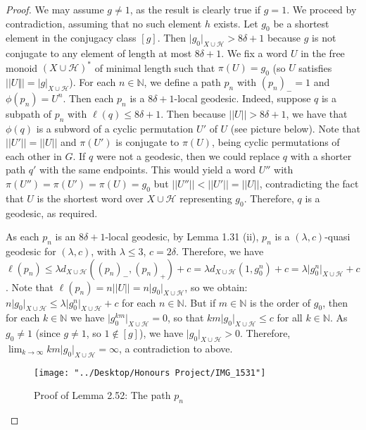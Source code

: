 \documentclass[12pt]{article}
\newcommand{\vs}{\vskip10pt}
\begin{document}
	\begin{proof}
		
		We may assume $g \neq 1$, as the result is clearly true if $g = 1$. We proceed by contradiction, assuming that no such element $h$ exists. Let $g_0$ be a shortest element in the conjugacy class $[g]$. Then $\vert g_0 \vert_{X \cup \mathcal{H}} > 8 \delta + 1$ because $g$ is not conjugate to any element of length at most $8 \delta + 1$. We fix a word $U$ in the free monoid $(X \cup \mathcal{H})^*$ of minimal length such that $\pi(U) = g_0$ (so $U$ satisfies $\vert \vert U \Vert \vert = \vert g \vert_{X \cup \mathcal{H}}$). For each $n \in \mathbb{N}$, we define a path $p_n$ with $(p_n)_- = 1$ and $\phi(p_n) = U^n$. Then each $p_n$ is a $8 \delta + 1$-local geodesic. Indeed, suppose $q$ is a subpath of $p_n$ with $\ell(q) \leq 8 \delta + 1$. Then because $\vert \vert U \vert \vert > 8 \delta + 1$, we have that $\phi(q)$ is a subword of a cyclic permutation $U'$ of $U$ (see picture below). Note that $\vert \vert U' \vert \vert = \vert \vert U \vert \vert $ and $\pi(U')$ is conjugate to $\pi(U)$, being cyclic permutations of each other in $G$. If $q$ were not a geodesic, then we could replace $q$ with a shorter path $q'$ with the same endpoints. This would yield a word $U''$ with $\pi(U'') = \pi(U') = \pi(U) = g_0$ but $\vert \vert U'' \vert \vert < \vert \vert U' \vert \vert = \vert \vert U \vert \vert$, contradicting the fact that $U$ is the shortest word over $X \cup \mathcal{H}$ representing $g_0$. Therefore, $q$ is a geodesic, as required. 
		
		\vs 
		
		As each $p_n$ is an $8 \delta +1$-local geodesic, by Lemma 1.31 (ii), $p_n$ is a $(\lambda, c)$-quasi geodesic for $(\lambda, c)$, with $\lambda \leq 3$, $c = 2 \delta$. Therefore, we have $\ell(p_n) \leq \lambda d_{X \cup \mathcal{H}}((p_n)_-, (p_n)_+) + c = \lambda d_{X \cup \mathcal{H}}(1, g_0^n) + c = \lambda \vert g_0^n \vert_{X \cup \mathcal{H}} + c$. Note that $\ell(p_n) = n \vert \vert U \vert \vert = n \vert g_0 \vert_{X \cup \mathcal{H}}$, so we obtain: $n \vert g_0 \vert_{X \cup \mathcal{H}} \leq \lambda \vert g_0^n \vert_{X \cup \mathcal{H}} + c$ for each $n \in \mathbb{N}$. But if $m \in \mathbb{N}$ is the order of $g_0$, then for each $k \in \mathbb{N}$ we have $\vert g_0^{km} \vert_{X \cup \mathcal{H}} = 0$, so that $km \vert g_0 \vert_{X \cup \mathcal{H}} \leq c$ for all $k \in \mathbb{N}$. As $g_0 \neq 1$ (since $g \neq 1$, so $1 \notin [g]$), we have $\vert g_0 \vert_{X \cup \mathcal{H}} > 0$. Therefore, $\lim_{k \rightarrow \infty} km \vert g_0 \vert_{X \cup \mathcal{H}} = \infty$, a contradiction to above. 
		
\begin{figure} [H]
	\centering
	\texttt{[image: "../Desktop/Honours Project/IMG\_1531"]}
	\caption{Proof of Lemma 2.52: The path $p_n$}
	\label{fig:img1531}
\end{figure}
		
	\end{proof}
	
\end{document}
